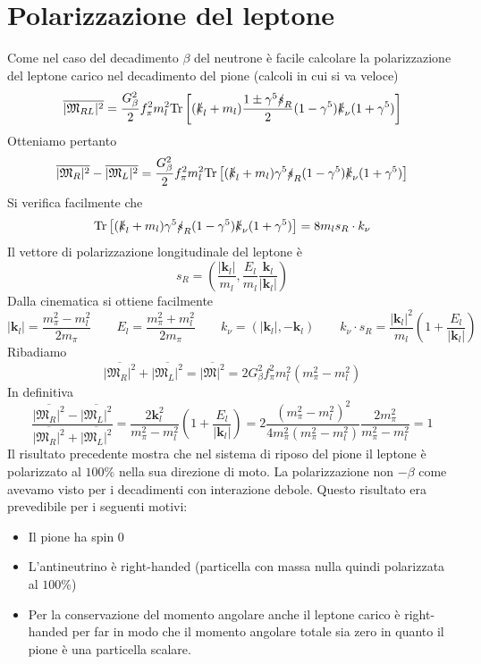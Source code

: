 \section{Polarizzazione del leptone}
Come nel caso del decadimento $\beta$ del neutrone è facile calcolare la polarizzazione del leptone carico nel decadimento del pione (calcoli in cui si va veloce)
$$
\overline{|\mathfrak{M}_{RL}|^2} = \frac{G_\beta^2}{2} f_\pi^2 m_l^2 \text{Tr} \left[ (\slashed{k}_l + m_l) \frac{1 \pm \gamma^5 \slashed{s}_R}{2} (1 - \gamma^5) \slashed{k}_\nu (1 + \gamma^5) \right]
$$
Otteniamo pertanto
$$
\overline{|\mathfrak{M}_R|^2} - \overline{|\mathfrak{M}_L|^2} = \frac{G_\beta^2}{2} f_\pi^2 m_l^2 \text{Tr} \left[ (\slashed{k}_l + m_l) \gamma^5 \slashed{s}_R (1 - \gamma^5) \slashed{k}_\nu (1 + \gamma^5) \right]
$$
Si verifica facilmente che
$$
\text{Tr} \left[ (\slashed{k}_l + m_l) \gamma^5 \slashed{s}_R (1 - \gamma^5) \slashed{k}_\nu (1 + \gamma^5) \right] = 8m_l s_R \cdot k_\nu
$$
Il vettore di polarizzazione longitudinale del leptone è
$$
s_R = \left( \frac{|\mathbf{k}_l|}{m_l}, \frac{E_l}{m_l} \frac{\mathbf{k}_l}{|\mathbf{k}_l|} \right)
$$
Dalla cinematica si ottiene facilmente
$$
|\mathbf{k}_l| = \frac{m_\pi^2 - m_l^2}{2m_\pi} \quad \quad E_l = \frac{m_\pi^2 + m_l^2}{2m_\pi} \qquad k_\nu = (|\mathbf{k}_l|, -\mathbf{k}_l) \quad \quad k_\nu \cdot s_R = \frac{|\mathbf{k}_l|^2}{m_l} \left( 1 + \frac{E_l}{|\mathbf{k}_l|} \right)
$$
Ribadiamo
$$
\overline{|\mathfrak{M}_R|^2} + \overline{|\mathfrak{M}_L|^2} = \overline{|\mathfrak{M}|^2} = 2G_\beta^2 f_\pi^2 m_l^2 (m_\pi^2 - m_l^2)
$$
In definitiva
$$
\frac{\overline{|\mathfrak{M}_R|^2} - \overline{|\mathfrak{M}_L|^2}}{\overline{|\mathfrak{M}_R|^2} + \overline{|\mathfrak{M}_L|^2}} = \frac{2\mathbf{k}_l^2}{m_\pi^2 - m_l^2} \left( 1 + \frac{E_l}{|\mathbf{k}_l|} \right) = 2 \frac{(m_\pi^2 - m_l^2)^2}{4m_\pi^2 (m_\pi^2 - m_l^2)} \frac{2m_\pi^2}{m_\pi^2 - m_l^2} = 1
$$
Il risultato precedente mostra che nel sistema di riposo del pione il leptone è polarizzato al $100\%$ nella sua direzione di moto. La polarizzazione non $-\beta$ come avevamo visto per i decadimenti con interazione debole. Questo risultato era prevedibile per i seguenti motivi:
\begin{itemize}
	\item Il pione ha spin $0$
	\item L'antineutrino è right-handed (particella con massa nulla quindi polarizzata al $100\%$)
	\item Per la conservazione del momento angolare anche il leptone carico è right-handed per far in modo che il momento angolare totale sia zero in quanto il pione è una particella scalare.
\end{itemize}
